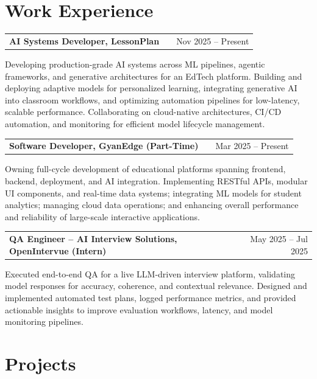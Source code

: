 \documentclass[a4paper,12pt]{article}
\makeatletter
\newenvironment{jobshort}[2]
    {
    \begin{tabularx}{\linewidth}{@{}l X r@{}}
    \textbf{#1} & \hfill &  #2 \\[3.75pt]
    \end{tabularx}
    }
    {
    }
\makeatother
\begin{document}
\section{Work Experience}

\begin{jobshort}{AI Systems Developer, LessonPlan}{Nov 2025 – Present}
Developing production-grade AI systems across ML pipelines, agentic frameworks, and generative architectures for an EdTech platform. Building and deploying adaptive models for personalized learning, integrating generative AI into classroom workflows, and optimizing automation pipelines for low-latency, scalable performance. Collaborating on cloud-native architectures, CI/CD automation, and monitoring for efficient model lifecycle management.
\end{jobshort}

\begin{jobshort}{Software Developer, GyanEdge (Part-Time)}{Mar 2025 – Present}
Owning full-cycle development of educational platforms spanning frontend, backend, deployment, and AI integration. Implementing RESTful APIs, modular UI components, and real-time data systems; integrating ML models for student analytics; managing cloud data operations; and enhancing overall performance and reliability of large-scale interactive applications.
\end{jobshort}

\begin{jobshort}{QA Engineer – AI Interview Solutions, OpenIntervue (Intern)}{May 2025 – Jul 2025}
Executed end-to-end QA for a live LLM-driven interview platform, validating model responses for accuracy, coherence, and contextual relevance. Designed and implemented automated test plans, logged performance metrics, and provided actionable insights to improve evaluation workflows, latency, and model monitoring pipelines.
\end{jobshort}
  


\section{Projects}

\end{document}
